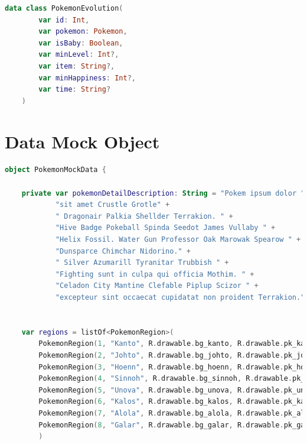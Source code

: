 \documentclass[a4paper, 12pt]{article}
\begin{document}
\begin{lstlisting}[caption={Pokemon Stats Data Class.}, label={code:pk_evolution_class}, language=Kotlin]
    data class PokemonEvolution(
        var id: Int,
        var pokemon: Pokemon,
        var isBaby: Boolean,
        var minLevel: Int?,
        var item: String?,
        var minHappiness: Int?,
        var time: String?
    )
\end{lstlisting}


\section{Data Mock Object}
\label{appendix:dataMock}

\begin{lstlisting}[caption={PokemonMockData Object.}, label={code:mockData}, language=Kotlin]
    object PokemonMockData {

    private var pokemonDetailDescription: String = "Pokem ipsum dolor " +
            "sit amet Crustle Grotle" +
            " Dragonair Palkia Shellder Terrakion. " +
            "Hive Badge Pokeball Spinda Seedot James Vullaby " +
            "Helix Fossil. Water Gun Professor Oak Marowak Spearow " +
            "Dunsparce Chimchar Nidorino." +
            " Silver Azumarill Tyranitar Trubbish " +
            "Fighting sunt in culpa qui officia Mothim. " +
            "Celadon City Mantine Clefable Piplup Scizor " +
            "excepteur sint occaecat cupidatat non proident Terrakion."


    var regions = listOf<PokemonRegion>(
        PokemonRegion(1, "Kanto", R.drawable.bg_kanto, R.drawable.pk_kanto),
        PokemonRegion(2, "Johto", R.drawable.bg_johto, R.drawable.pk_johto),
        PokemonRegion(3, "Hoenn", R.drawable.bg_hoenn, R.drawable.pk_hoenn),
        PokemonRegion(4, "Sinnoh", R.drawable.bg_sinnoh, R.drawable.pk_sinnoh),
        PokemonRegion(5, "Unova", R.drawable.bg_unova, R.drawable.pk_unova),
        PokemonRegion(6, "Kalos", R.drawable.bg_kalos, R.drawable.pk_kalos),
        PokemonRegion(7, "Alola", R.drawable.bg_alola, R.drawable.pk_alola),
        PokemonRegion(8, "Galar", R.drawable.bg_galar, R.drawable.pk_galar),
        )


\end{lstlisting}
\end{document}
